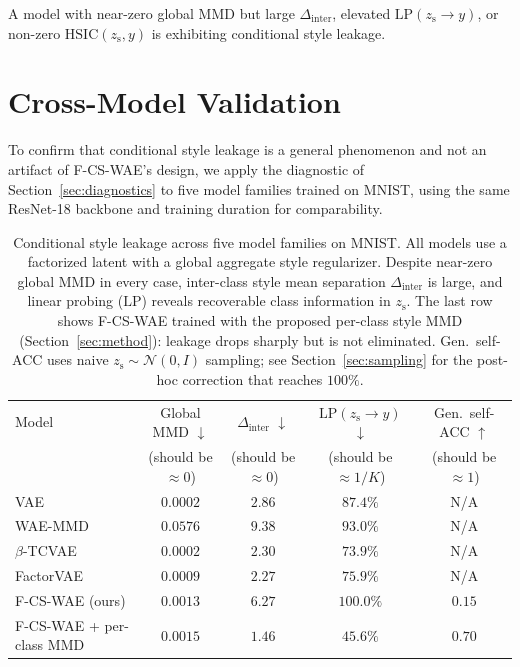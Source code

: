 \documentclass[10pt]{article}
\newcommand{\ours}{F-CS-WAE}
\newcommand{\zs}{z_{\mathrm{s}}}
\newcommand{\HSIC}{\mathrm{HSIC}}
\begin{document}
A model with near-zero global MMD but large $\Delta_{\mathrm{inter}}$, elevated
$\mathrm{LP}(\zs\to y)$, or non-zero $\HSIC(\zs,y)$ is exhibiting conditional
style leakage.

\section{Cross-Model Validation}
\label{sec:cross-model}

To confirm that conditional style leakage is a general phenomenon and not an artifact
of F-CS-WAE's design, we apply the diagnostic of Section~\ref{sec:diagnostics} to
five model families trained on MNIST, using the same ResNet-18 backbone and
training duration for comparability.

\begin{table}[t]
\centering
\caption{Conditional style leakage across five model families on MNIST.
         All models use a factorized latent with a global aggregate style regularizer.
         Despite near-zero global MMD in every case, inter-class style mean
         separation $\Delta_{\mathrm{inter}}$ is large, and linear probing
         ($\mathrm{LP}$) reveals recoverable class information in $\zs$.
         The last row shows \ours{} trained with the proposed per-class style MMD
         (Section~\ref{sec:method}): leakage drops sharply but is not eliminated.
         Gen.\ self-ACC uses naive $\zs\sim\mathcal{N}(0,I)$ sampling; see
         Section~\ref{sec:sampling} for the post-hoc correction that reaches $100\%$.}
\label{tab:cross-model}
\begin{tabular}{lcccc}
\toprule
Model & Global MMD $\downarrow$ & $\Delta_{\mathrm{inter}}$ $\downarrow$ & $\mathrm{LP}(\zs\to y)$ $\downarrow$ & Gen.\ self-ACC $\uparrow$ \\
& (should be $\approx 0$) & (should be $\approx 0$) & (should be $\approx 1/K$) & (should be $\approx 1$) \\
\midrule
VAE              & $0.0002$ & $2.86$ & $87.4\%$ & N/A \\
WAE-MMD          & $0.0576$ & $9.38$ & $93.0\%$ & N/A \\
$\beta$-TCVAE    & $0.0002$ & $2.30$ & $73.9\%$ & N/A \\
FactorVAE        & $0.0009$ & $2.27$ & $75.9\%$ & N/A \\
\ours{} (ours)   & $0.0013$ & $6.27$ & $100.0\%$ & $0.15$ \\
\midrule
\ours{} + per-class MMD & $0.0015$ & $1.46$ & $45.6\%$ & $0.70$ \\
\bottomrule
\end{tabular}
\end{table}
\end{document}
